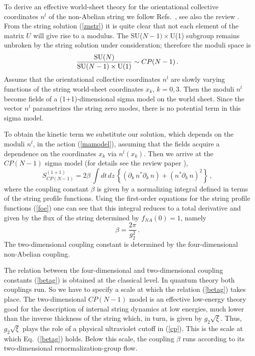 \documentclass[epsfig,12pt]{article}
\def\beq{\begin{equation}}
\def\eeq{\end{equation}}
\newcommand{\pt}{\partial}
\begin{document}
To derive an effective world-sheet theory for the orientational collective 
coordinates $n^l$ of the non-Abelian string we follow
Refs.~\cite{ABEKY,SYmon,GSY05}, see also the  review \cite{SYrev}.
From the string solution (\ref{znstr}) it is quite  clear that  not each element of
the matrix $U$ will give rise to a modulus. The SU($N-1) \times$U(1)
subgroup remains unbroken by the string solution under consideration; 
therefore the moduli space is
\beq
\frac{{\rm SU}(N)}{{\rm SU}(N-1)\times {\rm U}(1)}\sim CP(N-1)\,.
\label{modulispace}
\eeq
Assume  that the orientational collective coordinates $n^l$
are slowly varying functions of the string world-sheet coordinates
$x_k$, $k=0,3$. Then the moduli $n^l$ become fields of a
(1+1)-dimensional sigma model on the world sheet. Since
the vector $n^l$ parametrizes the string zero modes,
there is no potential term in this sigma model.  

To obtain the   kinetic term  we substitute our solution, which depends
on the moduli $ n^l$, in the action (\ref{mamodel}), assuming  that
the fields acquire a dependence on the coordinates $x_k$ via $n^l(x_k)$.
Then we arrive at the $CP(N-1)$  sigma model (for details see  the review 
paper \cite{SYrev}),
\beq
S^{(1+1)}_{CP(N-1)}= 2 \beta\,   \int d t\, dz \,  \left\{(\pt_{k}\, n^*
\pt_{k}\, n) + (n^*\pt_{k}\, n)^2\right\}\,,
\label{cp}
\eeq
where the coupling constant $\beta$ is given by a normalizing integral
defined in terms of the string profile functions.
Using the first-order equations for the string profile functions (\ref{foe})
one can see that
this integral   reduces to a total derivative and given
by the flux of the string  determined by $f_{NA}(0)=1$, namely
\beq
\beta= \frac{2\pi}{g_2^2}\,.
\label{betag}
\eeq
The two-dimensional coupling constant is determined by the
four-dimensional non-Abelian coupling.


The relation between the four-dimensional and two-dimensional coupling
constants (\ref{betag}) is obtained  at the classical level. In quantum theory
both couplings run. So we have to specify a scale at which the relation
(\ref{betag}) takes place. The two-dimensional $CP(N-1)$ model
 is
an effective low-energy theory good for the description of
internal string dynamics  at low energies,  much lower than the
inverse thickness of the string which, in turn, is given by $g_2\sqrt{\xi}$. Thus,
$g_2\sqrt{\xi}$ plays the role of a physical ultraviolet  cutoff in
(\ref{cp}).
This is the scale at which Eq.~(\ref{betag}) holds. Below this scale, the
coupling $\beta$ runs according to its two-dimensional renormalization-group
flow.
\end{document}
